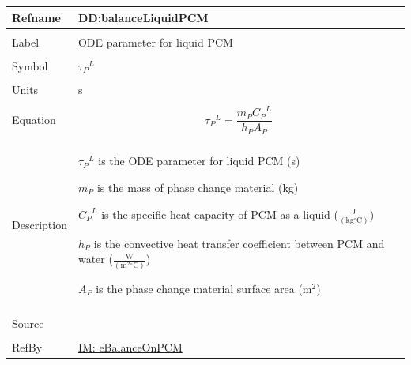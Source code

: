 \documentclass[12pt]{article}
\begin{document}
\noindent \begin{minipage}{\textwidth}
\begin{tabular}{p{} p{}}
\toprule \textbf{Refname} & \textbf{DD:balanceLiquidPCM}
\label{DD:balanceLiquidPCM}
\\ \midrule \\
Label & ODE parameter for liquid PCM
\\ \midrule \\
Symbol & ${{τ_{P}}^{L}}$
\\ \midrule \\
Units & s
\\ \midrule \\
Equation & \begin{displaymath}
           {{τ_{P}}^{L}}=\frac{{m_{P}} {{C_{P}}^{L}}}{{h_{P}} {A_{P}}}
           \end{displaymath}
\\ \midrule \\
Description & \begin{symbDescription}
              \item{${{τ_{P}}^{L}}$ is the ODE parameter for liquid PCM (s)}
              \item{${m_{P}}$ is the mass of phase change material (kg)}
              \item{${{C_{P}}^{L}}$ is the specific heat capacity of PCM as a liquid ($\frac{\text{J}}{(\text{kg}{}^{\circ}\text{C})}$)}
              \item{${h_{P}}$ is the convective heat transfer coefficient between PCM and water ($\frac{\text{W}}{(\text{m}^{2}{}^{\circ}\text{C})}$)}
              \item{${A_{P}}$ is the phase change material surface area ($\text{m}^{2}$)}
              \end{symbDescription}
\\ \midrule \\
Source & \cite{lightstone2012}
\\ \midrule \\
RefBy & \hyperref[IM:eBalanceOnPCM]{IM: eBalanceOnPCM}
\\ \bottomrule \end{tabular}
\end{minipage}
\par~
\end{document}
